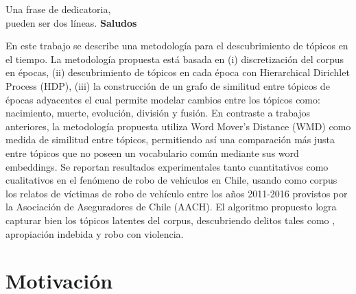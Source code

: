 \documentclass[letterpaper,12pt,oneside]{book} %
\begin{document}



\begin{dedicatoria}
	Una frase de dedicatoria, \\
	pueden ser dos líneas. \newp
	\textbf{Saludos}
\end{dedicatoria}

\begin{agradecimientos}
\end{agradecimientos}



\begin{resumen}
    En este trabajo se describe una metodología para el descubrimiento de tópicos en el tiempo. La metodología propuesta está basada en (i) discretización del corpus en épocas, (ii) descubrimiento de tópicos en cada época con Hierarchical Dirichlet Process (HDP), (iii) la construcción de un grafo de similitud entre tópicos de épocas adyacentes el cual permite modelar cambios entre los tópicos como: nacimiento, muerte, evolución, división y fusión. En contraste a trabajos anteriores, la metodología propuesta utiliza Word Mover's Distance (WMD) como medida de similitud entre tópicos, permitiendo así una comparación más justa entre tópicos que no poseen un vocabulario común mediante sus word embeddings. Se reportan resultados experimentales tanto cuantitativos como cualitativos en el fenómeno de robo de vehículos en Chile, usando como corpus los relatos de víctimas de robo de vehículo entre los años 2011-2016 provistos por la Asociación de Aseguradores de Chile (AACH). El algoritmo propuesto logra capturar bien los tópicos latentes del corpus, descubriendo delitos tales como , apropiación indebida y robo con violencia.
\end{resumen}


\hypersetup{
    citecolor=Blue
}

\listoftodos
\chapter{Motivación}
\end{document}
